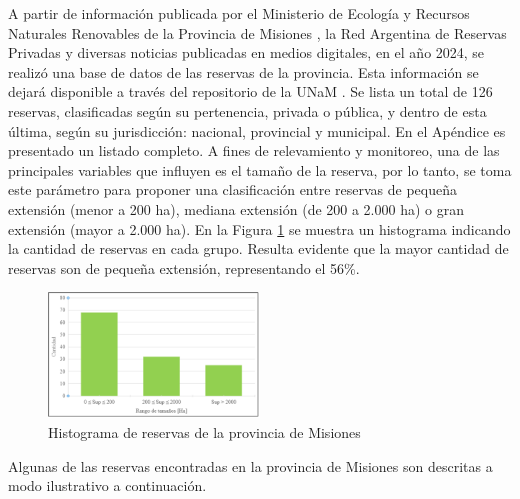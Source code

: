 A partir de información publicada por el Ministerio de Ecología y Recursos Naturales Renovables de la Provincia de Misiones \cite{noauthor_areas_nodate}, la Red Argentina de Reservas Privadas \cite{noauthor_red_nodate} y diversas noticias publicadas en medios digitales, en el año 2024, se realizó una base de datos de las reservas de la provincia. Esta información se dejará disponible a través del repositorio de la UNaM \cite{noauthor_principal_nodate}.
Se lista un total de 126 reservas, clasificadas según  su pertenencia, privada o pública, y dentro de esta última, según su jurisdicción: nacional, provincial y municipal. En el Apéndice es presentado un listado completo.
A fines de relevamiento y monitoreo, una de las principales variables que influyen es el tamaño de la reserva, por lo tanto, se toma este parámetro para proponer una clasificación entre reservas de pequeña extensión (menor a 200 ha), mediana extensión (de 200 a 2.000 ha) o gran extensión (mayor a 2.000 ha). En la Figura \ref{hist_res} se muestra un histograma indicando la cantidad de reservas en cada grupo. Resulta evidente que la mayor cantidad de reservas son de pequeña extensión, representando el 56\%.
\begin{figure}[h!]
    \centering
    \includegraphics[width=0.5\textwidth]{Imagenes/histograma_reservas.png}
     \hfill
     \caption{Histograma de reservas de la provincia de Misiones}
    \label{hist_res}
\end{figure}



Algunas de las reservas encontradas en la provincia de Misiones son descritas a modo ilustrativo a continuación.

